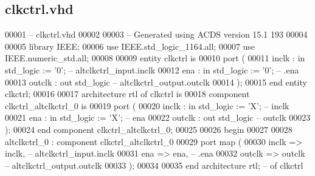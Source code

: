\subsection{clkctrl.\+vhd}
\label{clkctrl_8vhd_source}

\begin{DoxyCode}
00001 \textcolor{keyword}{-- clkctrl.vhd}
00002 
00003 \textcolor{keyword}{-- Generated using ACDS version 15.1 193}
00004 
00005 \textcolor{vhdlkeyword}{library }\textcolor{keywordflow}{IEEE};
00006 \textcolor{vhdlkeyword}{use }IEEE.std\_logic\_1164.\textcolor{keywordflow}{all};
00007 \textcolor{vhdlkeyword}{use }IEEE.numeric\_std.\textcolor{keywordflow}{all};
00008 
00009 \textcolor{keywordflow}{entity }clkctrl \textcolor{keywordflow}{is}
00010     \textcolor{keywordflow}{port} \textcolor{vhdlchar}{(}
00011         \textcolor{vhdlchar}{inclk}  \textcolor{vhdlchar}{:} \textcolor{keywordflow}{in}  \textcolor{comment}{std\_logic} \textcolor{vhdlchar}{:=} \textcolor{vhdlchar}{'}\textcolor{vhdllogic}{}\textcolor{vhdllogic}{0}\textcolor{vhdlchar}{'};\textcolor{keyword}{ --  altclkctrl\_input.inclk}
00012         \textcolor{vhdlchar}{ena}    \textcolor{vhdlchar}{:} \textcolor{keywordflow}{in}  \textcolor{comment}{std\_logic} \textcolor{vhdlchar}{:=} \textcolor{vhdlchar}{'}\textcolor{vhdllogic}{}\textcolor{vhdllogic}{0}\textcolor{vhdlchar}{'};\textcolor{keyword}{ --                  .ena}
00013         \textcolor{vhdlchar}{outclk} \textcolor{vhdlchar}{:} \textcolor{keywordflow}{out} \textcolor{comment}{std\_logic}\textcolor{keyword}{         -- altclkctrl\_output.outclk}
00014     \textcolor{vhdlchar}{)};
00015 \textcolor{keywordflow}{end} \textcolor{keywordflow}{entity} \textcolor{vhdlchar}{clkctrl};
00016 
00017 \textcolor{keywordflow}{architecture} rtl \textcolor{keywordflow}{of} clkctrl is
00018     \textcolor{keywordflow}{component} clkctrl\_altclkctrl\_0 \textcolor{keywordflow}{is}
00019         \textcolor{keywordflow}{port} (
00020             inclk  : \textcolor{keywordflow}{in}  \textcolor{comment}{std\_logic} := 'X'; \textcolor{keyword}{-- inclk}
00021             ena    : \textcolor{keywordflow}{in}  \textcolor{comment}{std\_logic} := 'X'; \textcolor{keyword}{-- ena}
00022             outclk : \textcolor{keywordflow}{out} \textcolor{comment}{std\_logic}\textcolor{keyword}{         -- outclk}
00023         );
00024     \textcolor{keywordflow}{end} \textcolor{keywordflow}{component} \textcolor{vhdlchar}{clkctrl_altclkctrl_0};
00025 
00026 \textcolor{vhdlkeyword}{begin}
00027 
00028     altclkctrl_0 : \textcolor{keywordflow}{component} clkctrl\_altclkctrl\_0
00029         \textcolor{keywordflow}{port} \textcolor{keywordflow}{map} (
00030             inclk  => inclk,\textcolor{keyword}{  --  altclkctrl\_input.inclk}
00031             ena    => ena,\textcolor{keyword}{    --                  .ena}
00032             outclk => outclk  \textcolor{keyword}{-- altclkctrl\_output.outclk}
00033         \textcolor{vhdlchar}{)};
00034 
00035 \textcolor{keywordflow}{end} \textcolor{keywordflow}{architecture} \textcolor{vhdlchar}{rtl};\textcolor{keyword}{ -- of clkctrl}
\end{DoxyCode}
